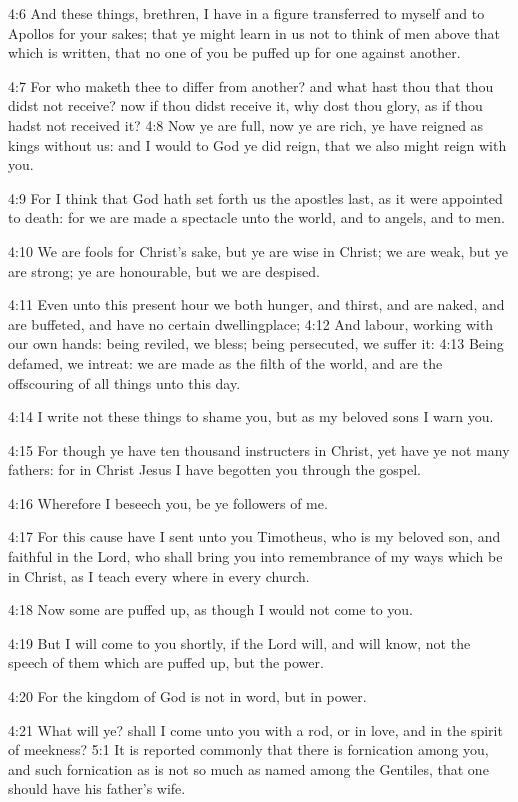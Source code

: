 4:6 And these things, brethren, I have in a figure transferred to myself and to Apollos for your sakes; that ye might learn in us not to think of men above that which is written, that no one of you be puffed up for one against another.

4:7 For who maketh thee to differ from another? and what hast thou that thou didst not receive? now if thou didst receive it, why dost thou glory, as if thou hadst not received it?  4:8 Now ye are full, now ye are rich, ye have reigned as kings without us: and I would to God ye did reign, that we also might reign with you.

4:9 For I think that God hath set forth us the apostles last, as it were appointed to death: for we are made a spectacle unto the world, and to angels, and to men.

4:10 We are fools for Christ's sake, but ye are wise in Christ; we are weak, but ye are strong; ye are honourable, but we are despised.

4:11 Even unto this present hour we both hunger, and thirst, and are naked, and are buffeted, and have no certain dwellingplace; 4:12 And labour, working with our own hands: being reviled, we bless; being persecuted, we suffer it: 4:13 Being defamed, we intreat: we are made as the filth of the world, and are the offscouring of all things unto this day.

4:14 I write not these things to shame you, but as my beloved sons I warn you.

4:15 For though ye have ten thousand instructers in Christ, yet have ye not many fathers: for in Christ Jesus I have begotten you through the gospel.

4:16 Wherefore I beseech you, be ye followers of me.

4:17 For this cause have I sent unto you Timotheus, who is my beloved son, and faithful in the Lord, who shall bring you into remembrance of my ways which be in Christ, as I teach every where in every church.

4:18 Now some are puffed up, as though I would not come to you.

4:19 But I will come to you shortly, if the Lord will, and will know, not the speech of them which are puffed up, but the power.

4:20 For the kingdom of God is not in word, but in power.

4:21 What will ye? shall I come unto you with a rod, or in love, and in the spirit of meekness?  5:1 It is reported commonly that there is fornication among you, and such fornication as is not so much as named among the Gentiles, that one should have his father's wife.

